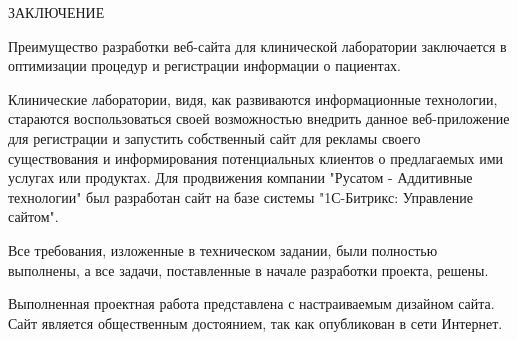 \newpage
\begin{center}ЗАКЛЮЧЕНИЕ\end{center}


Преимущество разработки веб-сайта для клинической лаборатории заключается в оптимизации процедур и регистрации информации о пациентах. 

Клинические лаборатории, видя, как развиваются информационные технологии, стараются воспользоваться своей возможностью внедрить данное веб-приложение для регистрации и запустить собственный сайт для рекламы своего существования и информирования потенциальных клиентов о предлагаемых ими услугах или продуктах. 
Для продвижения компании "Русатом - Аддитивные технологии" был разработан сайт на базе системы "1С-Битрикс: Управление сайтом".

Все требования, изложенные в техническом задании, были полностью выполнены, а все задачи, поставленные в начале разработки проекта, решены.

Выполненная проектная работа представлена с настраиваемым дизайном сайта. Сайт является общественным достоянием, так как опубликован в сети Интернет.  
